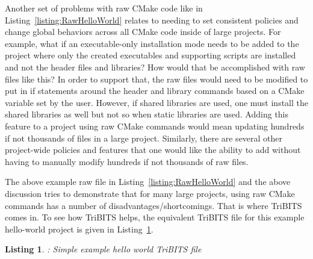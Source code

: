 \documentclass[note]{TechNote}
\newtheorem{listing}{Listing}
\begin{document}
Another set of problems with raw CMake code like in Listing~\ref{listing:RawHelloWorld} relates to needing to set consistent policies and change global behaviors across all CMake code inside of large projects.  For example, what if an executable-only installation mode needs to be added to the project where only the created executables and supporting scripts are installed and not the header files and libraries?  How would that be accomplished with raw  files like this?  In order to support that, the raw  files would need to be modified to put in if statements around the header and library  commands based on a CMake variable set by the user.  However, if shared libraries are used, one must install the shared libraries as well but not so when static libraries are used.  Adding this feature to a project using raw CMake commands would mean updating hundreds if not thousands of  files in a large project.  Similarly, there are several other project-wide policies and features that one would like the ability to add without having to manually modify hundreds if not thousands of raw  files.

The above example raw  file in Listing~\ref{listing:RawHelloWorld} and the above discussion tries to demonstrate that for many large projects, using raw CMake commands has a number of disadvantages/shortcomings.  That is where TriBITS comes in.  To see how TriBITS helps, the equivalent TriBITS  file for this example hello-world project is given in Listing~\ref{listing:TribitsHelloWorld}.

\begin{listing}: Simple example hello world TriBITS  file
\label{listing:TribitsHelloWorld}
{\small

}
\end{listing}
\end{document}
